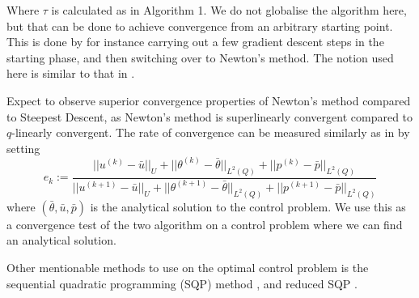 Where $\tau$ is calculated as in Algorithm 1. We do not globalise the algorithm here, but that can be done to achieve convergence from an arbitrary starting point. This is done by for instance carrying out a few gradient descent steps in the starting phase, and then switching over to Newton's method. The notion used here is similar to that in \cite{Algorithms}. 

Expect to observe superior convergence properties of Newton's method compared to Steepest Descent, as Newton's method is superlinearly convergent compared to $q$-linearly convergent. The rate of convergence can be measured similarly as in \cite{DPSteel} by setting 
\begin{equation}
    \label{eq:rate_of_conv}
    e_k := \frac{||u^{(k)}-\bar{u}||_U + ||\theta^{(k)}-\bar{\theta}||_{L^2(Q)} +||p^{(k)}-\bar{p}||_{L^2(Q)} }{||u^{(k+1)}-\bar{u}||_U + ||\theta^{(k+1)}-\bar{\theta}||_{L^2(Q)} +||p^{(k+1)}-\bar{p}||_{L^2(Q)}}
\end{equation}
where $(\bar{\theta},\bar{u},\bar{p})$ is the analytical solution to the control problem. We use this as a convergence test of the two algorithm on a control problem where we can find an analytical solution. 

Other mentionable methods to use on the optimal control problem is the sequential quadratic programming (SQP) method \cite{Algorithms}, and reduced SQP \cite{DPSteel}. 
